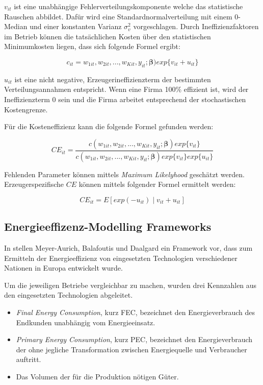 $v_{it}$ ist eine unabhängige Fehlerverteilungskomponente welche das statistische Rauschen abbildet. Dafür wird eine Standardnormalverteilung mit einem 0-Median und einer konstanten Varianz $\sigma_{v}^2$ vorgeschlagen. Durch Ineffizienzfaktoren im Betrieb können die tatsächlichen Kosten über den statistischen Minimumkosten liegen,  dass sich folgende Formel ergibt:

\begin{equation}
	c_{it} = w_{1it},w_{2it},...,w_{Kit},y_{it};\boldsymbol{\beta})exp\{v_{it} + u_{it}\}
\end{equation}

$u_{it}$ ist eine nicht negative, Erzeugerineffizienzterm der bestimmten Verteilungsannahmen entspricht. Wenn eine Firma 100\% effizient ist, wird der Ineffizienzterm 0 sein und die Firma arbeitet entsprechend der stochastischen Kostengrenze.

Für die Kosteneffizienz kann die folgende Formel gefunden werden:

\begin{equation}
	CE_{it} = \frac{c(w_{1it},w_{2it},...,w_{Kit},y_{it};\boldsymbol{\beta})exp\{v_{it}\}}{c(w_{1it},w_{2it},...,w_{Kit},y_{it};\boldsymbol{\beta})exp\{v_{it}\}exp\{u_{it}\}}
\end{equation}

Fehlenden Parameter können mittels \textit{Maximum Likelyhood} geschätzt werden. Erzeugerspezifische $CE$ können mittels folgender Formel ermittelt werden:\cite{conf:Jian2013}

\begin{equation}
	CE_{it}=E[exp(-u_{it}) \mid v_{it}+u_{it}]
\end{equation}

\subsection{Energieeffizenz-Modelling Frameworks}
In \cite{jour:Meyer-Aurich2013} stellen Meyer-Aurich, Balafoutis und Daalgard ein Framework vor, dass zum Ermitteln der Energieeffizienz von eingesetzten Technologien verschiedener Nationen in Europa entwickelt wurde.

Um die jeweiligen Betriebe vergleichbar zu machen, wurden drei Kennzahlen aus den eingesetzten Technologien abgeleitet.

\begin{itemize}
	\item \textit{Final Energy Consumption}, kurz FEC, bezeichnet den Energieverbrauch des Endkunden unabhängig vom Energieeinsatz.
	\item \textit{Primary Energy Consumption}, kurz PEC, bezeichnet den Energieverbrauch der ohne jegliche Transformation zwischen Energiequelle und Verbraucher auftritt.
	\item Das Volumen der für die Produktion nötigen Güter.
\end{itemize}

